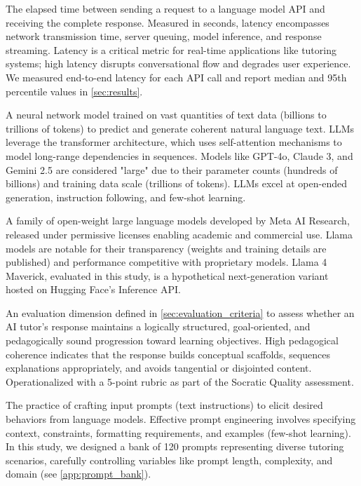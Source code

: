 \begin{description}[style=nextline,leftmargin=0em,itemsep=1em]
\item[\textbf{Latency}] The elapsed time between sending a request to a language model API and receiving the complete response. Measured in seconds, latency encompasses network transmission time, server queuing, model inference, and response streaming. Latency is a critical metric for real-time applications like tutoring systems; high latency disrupts conversational flow and degrades user experience. We measured end-to-end latency for each API call and report median and 95th percentile values in \cref{sec:results}.

\item[\textbf{LLM (Large Language Model)}] A neural network model trained on vast quantities of text data (billions to trillions of tokens) to predict and generate coherent natural language text. LLMs leverage the transformer architecture, which uses self-attention mechanisms to model long-range dependencies in sequences. Models like GPT-4o, Claude 3, and Gemini 2.5 are considered "large" due to their parameter counts (hundreds of billions) and training data scale (trillions of tokens). LLMs excel at open-ended generation, instruction following, and few-shot learning.

\item[\textbf{Llama}] A family of open-weight large language models developed by Meta AI Research, released under permissive licenses enabling academic and commercial use. Llama models are notable for their transparency (weights and training details are published) and performance competitive with proprietary models. Llama 4 Maverick, evaluated in this study, is a hypothetical next-generation variant hosted on Hugging Face's Inference API.

\item[\textbf{Pedagogical Coherence}] An evaluation dimension defined in \cref{sec:evaluation_criteria} to assess whether an AI tutor's response maintains a logically structured, goal-oriented, and pedagogically sound progression toward learning objectives. High pedagogical coherence indicates that the response builds conceptual scaffolds, sequences explanations appropriately, and avoids tangential or disjointed content. Operationalized with a 5-point rubric as part of the Socratic Quality assessment.

\item[\textbf{Prompt Engineering}] The practice of crafting input prompts (text instructions) to elicit desired behaviors from language models. Effective prompt engineering involves specifying context, constraints, formatting requirements, and examples (few-shot learning). In this study, we designed a bank of 120 prompts representing diverse tutoring scenarios, carefully controlling variables like prompt length, complexity, and domain (see \cref{app:prompt_bank}).


\end{description}
